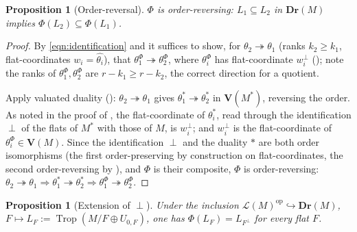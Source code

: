 \documentclass{article}
\newtheorem{proposition}[theorem]{Proposition}
\theoremstyle{definition}
\newcommand{\Trop}{\operatorname{Trop}}
\newcommand{\op}{\operatorname{op}}
\newcommand{\into}{\hookrightarrow}
\newcommand{\onto}{\twoheadrightarrow}
\newcommand{\Dr}{\mathbf{Dr}}
\newcommand{\bV}{\mathbf V}
\newcommand{\cLL}{\mathcal{L}}
\begin{document}
\begin{proposition}[Order-reversal]\label{prop:rev}
$\Phi$ is order-reversing: $L_1\subseteq L_2$ in $\Dr(M)$ implies $\Phi(L_2)\subseteq\Phi(L_1)$.
\end{proposition}

\begin{proof}
By \eqref{eqn:identification} and  it suffices to show, for $\theta_2\onto
\theta_1$ (ranks $k_2\ge k_1$, flat-coordinates $w_i=\widehat{\theta_i}$), that
$\theta_1^{\Phi}\onto\theta_2^{\Phi}$, where $\theta_i^{\Phi}$ has flat-coordinate $w_i^{\perp}$
(); note the ranks of $\theta_1^{\Phi},\theta_2^{\Phi}$ are $r-k_1\ge r-k_2$, the
correct direction for a quotient.

Apply valuated duality (): $\theta_2\onto\theta_1$ gives
$\theta_1^{*}\onto\theta_2^{*}$ in $\bV(M^{*})$, reversing the order. As noted in the proof of
, the flat-coordinate of $\theta_i^{*}$, read through the identification $\perp$ of the
flats of $M^{*}$ with those of $M$, is $w_i^{\perp}$; and $w_i^{\perp}$ is the flat-coordinate of
$\theta_i^{\Phi}\in\bV(M)$. Since the identification $\perp$ and the duality $*$ are both order
isomorphisms (the first order-preserving by construction on flat-coordinates, the second
order-reversing by ), and $\Phi$ is their composite, $\Phi$ is order-reversing:
$\theta_2\onto\theta_1\Rightarrow\theta_1^{*}\onto\theta_2^{*}\Rightarrow\theta_1^{\Phi}\onto
\theta_2^{\Phi}$.
\end{proof}

\begin{proposition}[Extension of $\perp$]\label{prop:ext}
Under the inclusion $\cLL(M)^{\op}\into\Dr(M)$, $F\mapsto L_F:=\Trop(M/F\oplus U_{0,F})$, one has
$\Phi(L_F)=L_{F^{\perp}}$ for every flat $F$.
\end{proposition}
\end{document}
